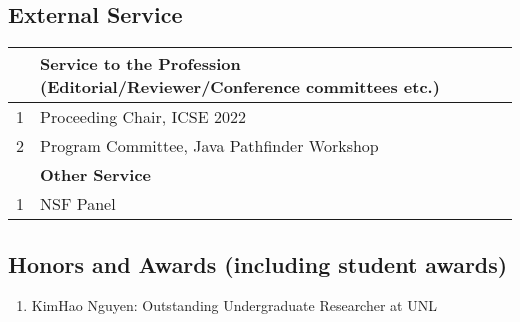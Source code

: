 \documentclass[11pt]{article}
\begin{document}
\subsection{External Service}
  \begin{tabular}{ll}
    \toprule
    \textbf{}& \textbf{Service to the Profession (Editorial/Reviewer/Conference committees etc.)}\\
      \midrule
    1& Proceeding Chair, ICSE 2022\\
    2& Program Committee, Java Pathfinder Workshop\\
    \toprule
    \textbf{}& \textbf{Other Service}\\
      \midrule
    1& NSF Panel\\
    \bottomrule
  \end{tabular}


\subsection{Honors and Awards (including student awards)}
\begin{enumerate}
    \item KimHao Nguyen: Outstanding Undergraduate Researcher at UNL\\
\end{enumerate}
\end{document}
